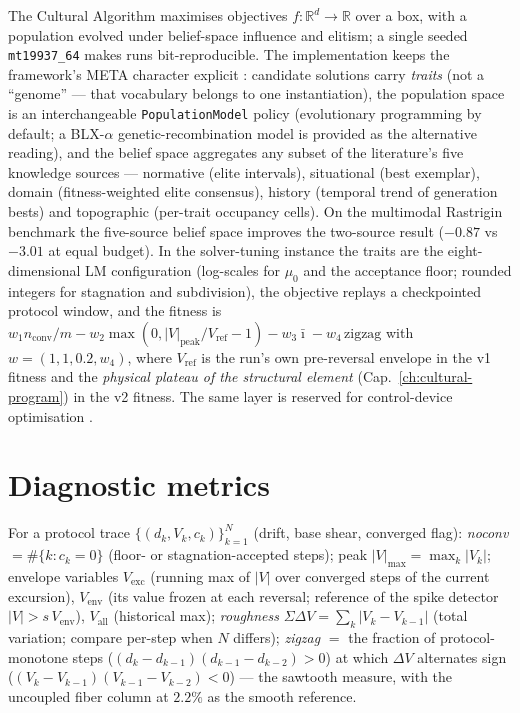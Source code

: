 The Cultural Algorithm \cite{Reynolds1994Cultural,ReynoldsPeng2004}
maximises objectives $f:\mathbb{R}^d\to\mathbb{R}$ over a box, with a
population evolved under belief-space influence and elitism; a single
seeded \texttt{mt19937\_64} makes runs bit-reproducible. The
implementation keeps the framework's META character explicit
\cite{Maheri2021CulturalSurvey}: candidate solutions carry
\emph{traits} (not a ``genome'' --- that vocabulary belongs to one
instantiation), the population space is an interchangeable
\texttt{PopulationModel} policy (evolutionary programming by default;
a BLX-$\alpha$ genetic-recombination model is provided as the
alternative reading), and the belief space aggregates any subset of
the literature's five knowledge sources --- normative (elite
intervals), situational (best exemplar), domain (fitness-weighted
elite consensus), history (temporal trend of generation bests) and
topographic (per-trait occupancy cells). On the multimodal Rastrigin
benchmark the five-source belief space improves the two-source result
($-0.87$ vs $-3.01$ at equal budget). In the solver-tuning instance
the traits are the eight-dimensional LM configuration (log-scales for
$\mu_0$ and the acceptance floor; rounded integers for stagnation and
subdivision), the objective replays a checkpointed protocol window,
and the fitness is
$w_1 n_{\text{conv}}/m - w_2\max(0, |V|_{\text{peak}}/V_{\text{ref}}
- 1) - w_3\bar\imath - w_4\,\mathrm{zigzag}$ with $w=(1,1,0.2,w_4)$,
where $V_{\text{ref}}$ is the run's own pre-reversal envelope in the
v1 fitness and the \emph{physical plateau of the structural element}
(Cap.~\ref{ch:cultural-program}) in the v2 fitness. The same layer is
reserved for control-device optimisation
\cite{LaraValenciaEchavarriaValencia2024}.

\section{Diagnostic metrics}
\label{sec:tc-metrics}

\begin{definition}
For a protocol trace $\{(d_k, V_k, c_k)\}_{k=1}^{N}$ (drift, base
shear, converged flag):
\emph{noconv} $=\#\{k: c_k=0\}$ (floor- or stagnation-accepted
steps); peak $|V|_{\max}=\max_k |V_k|$; envelope variables
$V_{\mathrm{exc}}$ (running max of $|V|$ over converged steps of the
current excursion), $V_{\mathrm{env}}$ (its value frozen at each
reversal; reference of the spike detector
$|V|> s\,V_{\mathrm{env}}$), $V_{\mathrm{all}}$ (historical max);
\emph{roughness} $\Sigma\Delta V = \sum_k |V_{k}-V_{k-1}|$ (total
variation; compare per-step when $N$ differs); \emph{zigzag} $=$ the
fraction of protocol-monotone steps ($ (d_k-d_{k-1})(d_{k-1}-d_{k-2})
> 0$) at which $\Delta V$ alternates sign
($(V_k-V_{k-1})(V_{k-1}-V_{k-2})<0$) --- the sawtooth measure, with
the uncoupled fiber column at $2.2\%$ as the smooth reference.
\end{definition}


